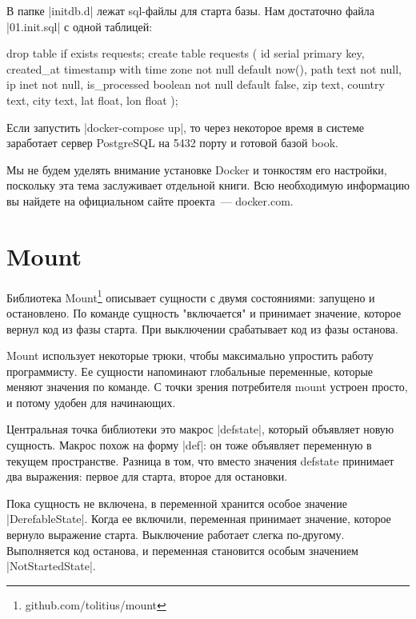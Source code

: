 В папке \spverb|initdb.d| лежат sql-файлы для старта базы. Нам достаточно файла
\spverb|01.init.sql| с одной таблицей:

\begin{code}
drop table if exists requests;
create table requests (
    id            serial primary key,
    created_at    timestamp with time zone
                    not null default now(),
    path          text not null,
    ip            inet not null,
    is_processed  boolean not null default false,
    zip           text,
    country       text,
    city          text,
    lat           float,
    lon           float
);
\end{code}

Если запустить \spverb|docker-compose up|, то через некоторое время в системе
заработает сервер PostgreSQL на 5432 порту и готовой базой book.

Мы не будем уделять внимание установке Docker и тонкостям его настройки,
поскольку эта тема заслуживает отдельной книги. Всю необходимую информацию вы
найдете на официальном сайте проекта~--- docker.com.

\section{Mount}

Библиотека Mount\footnote{github.com/tolitius/mount} описывает сущности с двумя
состояниями: запущено и остановлено. По команде сущность "включается" и
принимает значение, которое вернул код из фазы старта. При выключении
срабатывает код из фазы останова.

Mount использует некоторые трюки, чтобы максимально упростить работу
программисту. Ее сущности напоминают глобальные переменные, которые меняют
значения по команде. С точки зрения потребителя mount устроен просто, и потому
удобен для начинающих.

Центральная точка библиотеки это макрос \spverb|defstate|, который объявляет новую
сущность. Макрос похож на форму \spverb|def|: он тоже объявляет переменную в текущем
пространстве. Разница в том, что вместо значения defstate принимает два
выражения: первое для старта, второе для остановки.

Пока сущность не включена, в переменной хранится особое значение
\spverb|DerefableState|. Когда ее включили, переменная принимает значение, которое
вернуло выражение старта. Выключение работает слегка по-другому. Выполняется код
останова, и переменная становится особым значением \spverb|NotStartedState|.

